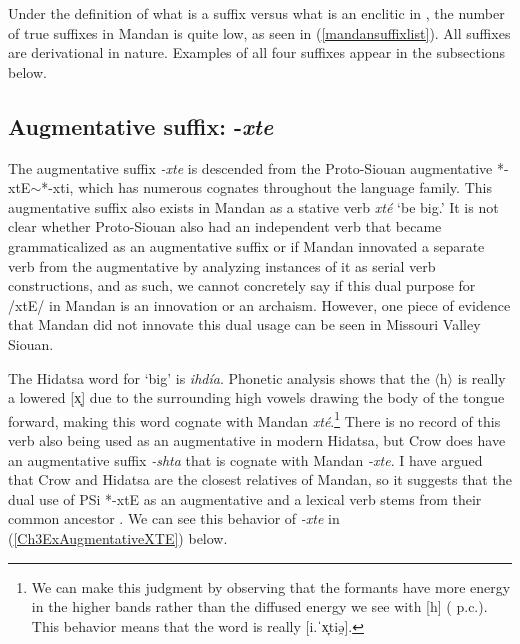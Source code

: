 Under the definition of what is a suffix versus what is an enclitic in \citet{kasak2019}, the number of true suffixes in Mandan is quite low, as seen in (\ref{mandansuffixlist}). All suffixes are derivational in nature. Examples of all four suffixes appear in the subsections below.

\subsection{Augmentative suffix: -\textit{xte}}\label{augmentativesuffix}

The augmentative suffix \textit{-xte} is descended from the Proto-Siouan augmentative *-xtE$\sim$*-xti, which has numerous cognates throughout the language family. This augmentative suffix also exists in Mandan as a stative verb \textit{xté} `be big.' It is not clear whether Proto-Siouan also had an independent verb that became grammaticalized as an augmentative suffix or if Mandan innovated a separate verb from the augmentative by analyzing instances of it as serial verb constructions, and as such, we cannot concretely say if this dual purpose for /xtE/ in Mandan is an innovation or an archaism. However, one piece of evidence that Mandan did not innovate this dual usage can be seen in Missouri Valley Siouan. 

The Hidatsa word for `big' is \textit{ihdía}. Phonetic analysis shows that the $\langle$h$\rangle$ is really a lowered [x̞] due to the surrounding high vowels drawing the body of the tongue forward, making this word cognate with Mandan \textit{xté}.\footnote{We can make this judgment by observing that the formants have more energy in the higher bands rather than the diffused energy we see with [h] (\citeauthor{torres2013a} p.c.). This behavior means that the word is really [i.ˈx̞tiə̯].} There is no record of this verb also being used as an augmentative in modern Hidatsa, but Crow does have an augmentative suffix \textit{-shta} that is cognate with Mandan \textit{-xte}. I have argued that Crow and Hidatsa are the closest relatives of Mandan, so it suggests that the dual use of PSi *-xtE as an augmentative and a lexical verb stems from their common ancestor \citep{kasak2015}. We can see this behavior of \textit{-xte} in (\ref{Ch3ExAugmentativeXTE}) below.

